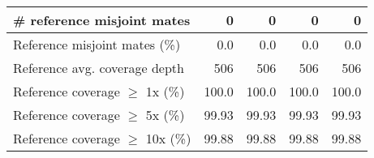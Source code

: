 \documentclass[12pt,a4paper]{article}
\begin{document}
\begin{table}[ht]
\begin{center}
\begin{tabular}{|l*{4}{|r}|}
\# reference misjoint mates & 0 & 0 & 0 & 0 \\ \hline
Reference misjoint mates (\%) & 0.0 & 0.0 & 0.0 & 0.0 \\ \hline
Reference avg. coverage depth & 506 & 506 & 506 & 506 \\ \hline
Reference coverage $\geq$ 1x (\%) & 100.0 & 100.0 & 100.0 & 100.0 \\ \hline
Reference coverage $\geq$ 5x (\%) & 99.93 & 99.93 & 99.93 & 99.93 \\ \hline
Reference coverage $\geq$ 10x (\%) & 99.88 & 99.88 & 99.88 & 99.88 \\ \hline
\end{tabular}
\end{center}
\end{table}
\end{document}
